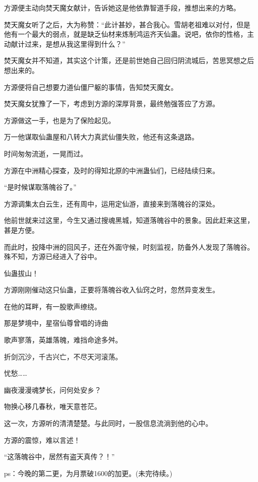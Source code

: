 \begin{this_body}
方源便主动向焚天魔女献计，告诉她这是他依靠智道手段，推想出来的方略。

焚天魔女听了之后，大为称赞：“此计甚妙，甚合我心。雪胡老祖难以对付，但是他有一个最大的弱点，就是缺乏仙材来炼制鸿运齐天仙蛊。说吧，依你的性格，主动献计过来，是想从我这里得到什么？”

焚天魔女并不知道，其实这个计策，还是前世她自己回归阴流城后，苦思冥想之后想出来的。

方源便将自己想要力道仙僵尸躯的事情，告知焚天魔女。

焚天魔女犹豫了一下，考虑到方源的深厚背景，最终勉强答应了方源。

方源做这一手，也是为了保险起见。

万一他谋取仙蛊屋和八转大力真武仙僵失败，他还有这条退路。

时间匆匆流逝，一晃而过。

方源在中洲精心探查，及时的得知北原的中洲蛊仙们，已经陆续归来。

“是时候谋取落魄谷了。”

方源调集太白云生，还有周中，运用定仙游，直接来到落魄谷的深处。

他前世就来过这里，今生又通过搜魂黑城，知道落魄谷中的景象。因此赶来这里，甚是方便。

而此时，投降中洲的回风子，还在外面守候，时刻监视，防备外人发现了落魄谷。殊不知，方源已经进入了谷中。

仙蛊拔山！

方源刚刚催动这只仙蛊，正要将落魄谷收入仙窍之时，忽然异变发生。

在他的耳畔，有一股歌声缭绕。

那是梦境中，星宿仙尊曾唱的诗曲

歌声寥落，英雄落魄，难挡命途多舛。

折剑沉沙，千古兴亡，不尽天河滚荡。

忧愁……

幽夜漫漫魂梦长，问何处安乡？

物换心移几春秋，唯天意苍茫。

这一次，方源听的清清楚楚。与此同时，一股信息流淌到他的心中。

方源的震惊，难以言述！

“这落魄谷中，居然有盗天真传？！”

ps：今晚的第二更，为月票破1600的加更。(未完待续。)

\end{this_body}

